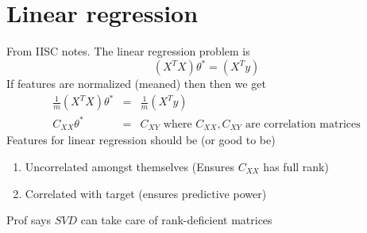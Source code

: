 \documentclass{article}
\newcommand{\beq}{\begin{equation}}
\newcommand{\eeq}{\end{equation}}
\newcommand{\ber}{\begin{eqnarray}}
\newcommand{\eer}{\end{eqnarray}}
\begin{document}
\section{Linear regression}
From IISC notes. The linear regression problem is
\beq
(X^TX)\theta^{*} = (X^Ty) 
\eeq
If features are normalized (meaned) then then we get
\ber
\frac{1}{m}(X^TX)\theta^{*} &=& \frac{1}{m}(X^Ty)  \\
C_{XX}\theta^{*} &=& C_{XY} \text{    where $C_{XX},C_{XY}$ are correlation matrices}
\eer
Features for linear regression should be (or good to be)
\begin{enumerate}
\item{Uncorrelated amongst themselves (Ensures $C_{XX}$ has full rank)}
\item{Correlated with target (ensures predictive power)}  
\end{enumerate}
Prof says $SVD$ can take care of rank-deficient matrices
\end{document}
